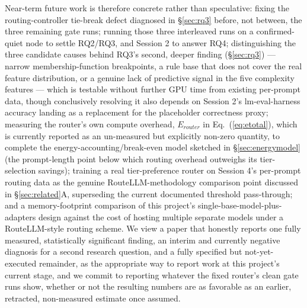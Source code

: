 \documentclass[conference]{IEEEtran}
\begin{document}
Near-term future work is therefore concrete rather than speculative:
fixing the routing-controller tie-break defect diagnosed in
\S\ref{sec:rq3} before, not between, the three remaining gate runs;
running those three interleaved runs on a confirmed-quiet node to settle
RQ2/RQ3, and Session 2 to answer RQ4; distinguishing the three candidate
causes behind RQ3's second, deeper finding (\S\ref{sec:rq3}) --- narrow
membership-function breakpoints, a rule base that does not cover the real
feature distribution, or a genuine lack of predictive signal in the five
complexity features --- which is testable without further GPU time from
existing per-prompt data, though conclusively resolving it also depends
on Session 2's lm-eval-harness accuracy landing as a replacement for the
placeholder correctness proxy; measuring the router's own compute
overhead, $E_{router}$ in Eq.~(\ref{eq:etotal}), which is currently
reported as an un-measured but explicitly non-zero quantity, to complete
the energy-accounting/break-even model sketched in
\S\ref{sec:energymodel} (the prompt-length point below which routing
overhead outweighs its tier-selection savings); training a real
tier-preference router on Session 4's per-prompt routing data as the
genuine RouteLLM-methodology comparison point discussed in
\S\ref{sec:related}A, superseding the current documented threshold
pass-through; and a memory-footprint comparison of this project's
single-base-model-plus-adapters design against the cost of hosting
multiple separate models under a RouteLLM-style routing scheme. We view a
paper that honestly reports one fully measured, statistically
significant finding, an interim and currently negative diagnosis for a
second research question, and a fully specified but not-yet-executed
remainder, as the appropriate way to report work at this project's
current stage, and we commit to reporting whatever the fixed router's
clean gate runs show, whether or not the resulting numbers are as
favorable as an earlier, retracted, non-measured estimate once assumed.
\end{document}
